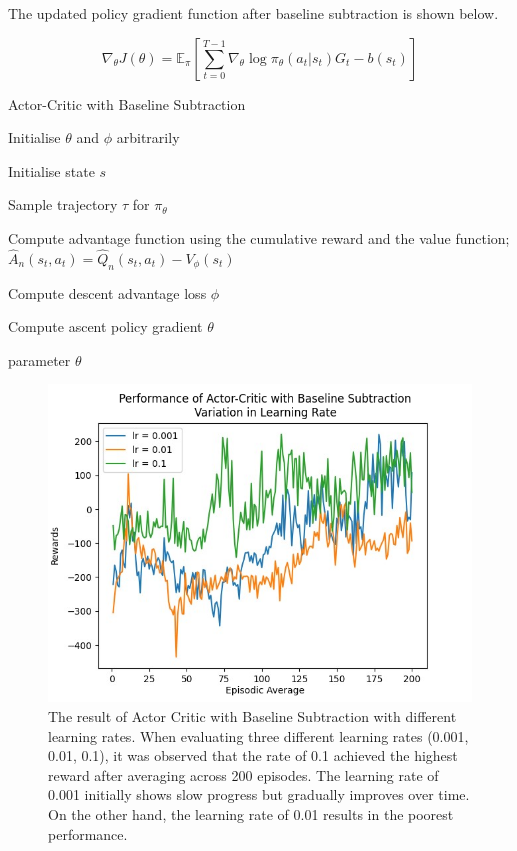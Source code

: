 \documentclass{article}
\begin{document}
The updated policy gradient function after baseline subtraction is shown below. 

\begin{equation*}
\nabla_\theta J(\theta) = \mathbb{E}_\pi[\sum _{t=0}^{T-1}  \nabla_\theta\log\pi_\theta (a_t|s_t)G_t - b(s_t)]
\end{equation*}
\begin{algorithm}[htbp]
\caption{Actor-Critic with Baseline Subtraction}
\SetAlgoLined
\DontPrintSemicolon
\small %
Initialise $\theta$ and $\phi$ arbitrarily\;\\
{
    Initialise state $s$\;
     \item Sample trajectory $\tau$ for $\pi_\theta$
     \item
    {
     \item Compute advantage function using the cumulative reward and the value function;
     \(\hat{A}_n(s_t,a_t) = \hat{Q}_n(s_t,a_t) - V_\phi(s_t)\)
    }
    \item Compute descent advantage loss $\phi$
    \item Compute ascent policy gradient $\theta$
}
\State \Return parameter $\theta$
\end{algorithm}

\begin{figure}[h!]
\centering
\includegraphics[width=0.9\linewidth]{Report/images/09.Performance_of_Actor_Critc_BSub_LR.png}
\caption{\label{fig:ActorCritic with Baseline Subtraction - Variation in Learning Rate}The result of Actor Critic with Baseline Subtraction with different learning rates. 
When evaluating three different learning rates (0.001, 0.01, 0.1), it was observed that the rate of 0.1 achieved the highest reward after averaging across 200 episodes. The learning rate of 0.001 initially shows slow progress but gradually improves over time. On the other hand, the learning rate of 0.01 results in the poorest performance.}
\end{figure}
\end{document}
